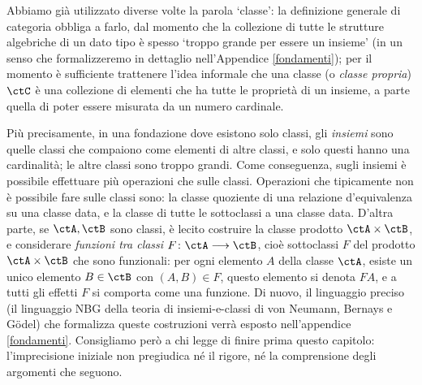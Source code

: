 \begin{remark}
 Abbiamo già utilizzato diverse volte la parola `classe': la definizione generale di categoria obbliga a farlo, dal momento che la collezione di tutte le strutture algebriche di un dato tipo è spesso `troppo grande per essere un insieme' (in un senso che formalizzeremo in dettaglio nell'Appendice \ref{fondamenti}); per il momento è sufficiente trattenere l'idea informale che una classe (o \emph{classe propria}) \(\ctC\) è una collezione di elementi che ha tutte le proprietà di un insieme, a parte quella di poter essere misurata da un numero cardinale.

 Più precisamente, in una fondazione dove esistono solo classi, gli \emph{insiemi} sono quelle classi che compaiono come elementi di altre classi, e solo questi hanno una cardinalità; le altre classi sono troppo grandi. Come conseguenza, sugli insiemi è possibile effettuare più operazioni che sulle classi. Operazioni che tipicamente non è possibile fare sulle classi sono: la classe quoziente di una relazione d'equivalenza su una classe data, e la classe di tutte le sottoclassi a una classe data.
 D'altra parte, se \(\ctA,\ctB\) sono classi, è lecito costruire la classe prodotto \(\ctA\times\ctB\), e considerare \emph{funzioni tra classi} \(F \colon \ctA\fun\ctB\), cioè sottoclassi \(F\) del prodotto \(\ctA\times\ctB\) che sono funzionali: per ogni elemento \(A\) della classe \(\ctA\), esiste un unico elemento \(B\in\ctB\) con \((A,B)\in F\), questo elemento si denota \(FA\), e a tutti gli effetti \(F\) si comporta come una funzione. Di nuovo, il linguaggio preciso (il linguaggio \textsf{NBG} della teoria di insiemi-e-classi di von Neumann, Bernays e G\"odel) 
 che formalizza queste costruzioni verrà esposto nell'appendice \ref{fondamenti}. Consigliamo però a chi legge di finire prima questo capitolo: l'imprecisione iniziale non pregiudica né il rigore, né la comprensione degli argomenti che seguono.
\end{remark}
